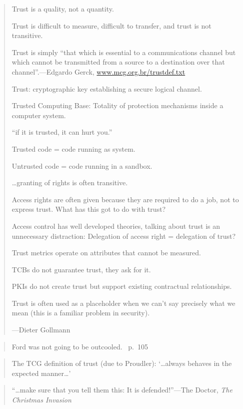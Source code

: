 \documentclass[a4paper]{article}
\begin{document}
\medskip
\begin{quote}
	Trust is a quality, not a quantity.

	Trust is difficult to measure, difficult to transfer, and
	trust is not transitive.

	Trust is simply ``that which is essential to a
	communications channel but which cannot be transmitted
	from a source to a destination over that
	channel''.---Edgardo Gerck, \url{www.mcg.org.br/trustdef.txt}

	Trust: cryptographic key establishing a secure logical
	channel.

	Trusted Computing Base: Totality of protection mechanisms
	inside a computer system.

	``if it is trusted, it can hurt you.''

	Trusted code = code running as system.

	Untrusted code = code running in a sandbox.

	\ldots granting of rights is often transitive.

	Access rights are often given because they are required to do
	a job, not to express trust. What has this got to do with trust?

	Access control has well developed theories, talking about trust
	is an unnecessary distraction: Delegation of access right =
	delegation of trust?

	Trust metrics operate on attributes that cannot be measured.

	TCBs do not guarantee trust, they ask for it.

	PKIs do not create trust but support existing contractual
	relationships.

	Trust is often used as a placeholder when we can't say
	precisely what we mean (this is a familiar problem in security).
	
	---Dieter Gollmann~\cite{Gollman2005}
\end{quote}

\medskip
\begin{quote}
	Ford was not going to be outcooled.~\cite{Adams1979} p.~105
\end{quote}

\medskip
\begin{quote}
	The TCG definition of trust (due to Proudler): `\ldots always
	behaves in the expected manner\ldots'
\end{quote}

\medskip
\begin{quote}
	``\ldots make sure that you tell them this: It is
	defended!''---The Doctor, \emph{The Christmas Invasion}
\end{quote}
\end{document}
